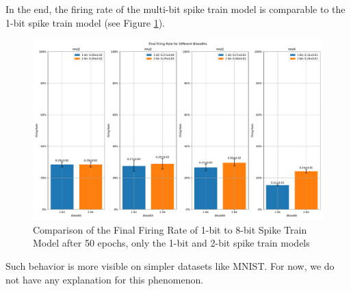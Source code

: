         In the end, the firing rate of the multi-bit spike train model is comparable to the 1-bit spike train model (see Figure \ref{fig:final_firing_rate}).
        \begin{figure}[!htpb]
            \centering
            \includegraphics[width=\textwidth]{../firerate/FashionMNIST/plots/fashionmnist_final_firerate.pdf}
            \caption{Comparison of the Final Firing Rate of 1-bit to 8-bit Spike Train Model after 50 epochs, only the 1-bit and 2-bit spike train models}
            \label{fig:final_firing_rate}
        \end{figure}

        Such behavior is more visible on simpler datasets like MNIST. For now, we do not have any explanation for this phenomenon.

